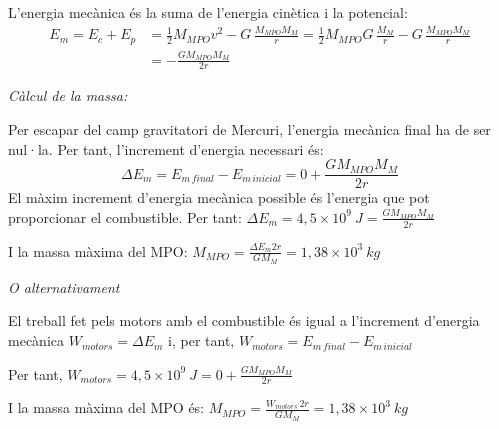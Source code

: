 \begin{solapartat}
 L'energia mecànica és la suma de l'energia cinètica i la potencial:
\begin{align*}
E_m = E_c + E_p &= \frac{1}{2}M_{MPO}v^2 - G\,\frac{M_{MPO}M_M}{r} = \frac{1}{2}M_{MPO}G\,\frac{M_M}{r} - G\,\frac{M_{MPO}M_M}{r}\\
&= -\frac{GM_{MPO}M_M}{2r}
\end{align*}

\textit{Càlcul de la massa:}

 Per escapar del camp gravitatori de Mercuri, l'energia mecànica final ha de ser nul·la. Per tant, l'increment d'energia necessari és:
\[ \Delta E_m = E_{m\,final} - E_{m\,inicial} = 0 + \frac{GM_{MPO}M_M}{2r} \]
 El màxim increment d'energia mecànica possible és l'energia que pot proporcionar el combustible. Per tant: $\Delta E_m = 4,5\times 10^{9}\ J = \frac{GM_{MPO}M_M}{2r}$

I la massa màxima del MPO: $M_{MPO} = \frac{\Delta E_m 2r}{GM_M} = 1,38\times 10^{3}\ kg$

\textit{O alternativament}

 El treball fet pels motors amb el combustible és igual a l'increment d'energia mecànica $W_{motors} = \Delta E_m$ i, per tant, $W_{motors} = E_{m\,final} - E_{m\,inicial}$

 Per tant, $W_{motors} = 4,5\times 10^{9}\ J = 0 + \frac{GM_{MPO}M_M}{2r}$

I la massa màxima del MPO és: $M_{MPO} = \frac{W_{motors}\,2r}{GM_M} = 1,38\times 10^{3}\ kg$
\end{solapartat}
